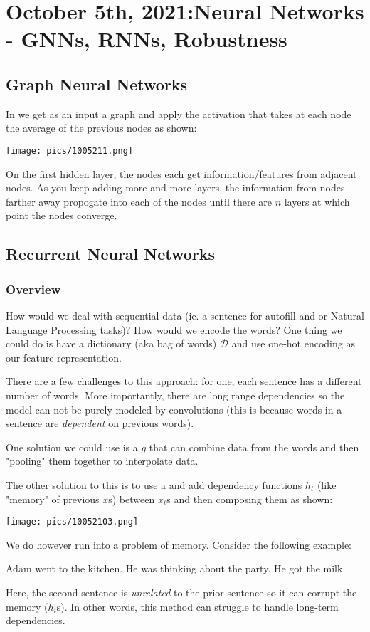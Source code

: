 \documentclass[11pt]{scrartcl}
\begin{document}
\newpage

\section{October 5th, 2021:Neural Networks - GNNs, RNNs, Robustness}

\subsection{Graph Neural Networks}
In  we get as an input a graph and apply the activation that takes at each node the average of the previous nodes as shown:
\begin{center}
    \texttt{[image: pics/1005211.png]}
\end{center}
On the first hidden layer, the nodes each get information/features from adjacent nodes. As you keep adding more and more layers, the information from nodes farther away propogate into each of the nodes until there are $n$ layers at which point the nodes converge. 

\subsection{Recurrent Neural Networks}
\subsubsection{Overview}
How would we deal with sequential data (ie. a sentence for autofill and or Natural Language Processing tasks)? How would we encode the words? One thing we could do is have a dictionary (aka bag of words) $\mathcal{D}$ and use one-hot encoding as our feature representation. 

There are a few challenges to this approach: for one, each sentence has a different number of words. More importantly, there are long range dependencies so the model can not be purely modeled by convolutions (this is because words in a sentence are \textit{dependent} on previous words). 

One solution we could use is a  $g$ that can combine data from the words and then "pooling" them together to interpolate data.

The other solution to this is to use a  and add dependency functions $h_t$ (like "memory" of previous $x$s) between $x_t$s and then composing them as shown:
\begin{center}
    \texttt{[image: pics/10052103.png]}
\end{center}
We do however run into a problem of memory. Consider the following example:
\begin{ex}
Adam went to the kitchen. He was thinking about the party. He got the milk.
\end{ex}
Here, the second sentence is \textit{unrelated} to the prior sentence so it can corrupt the memory ($h_i$s). In other words, this method can struggle to handle long-term dependencies.  
\end{document}
